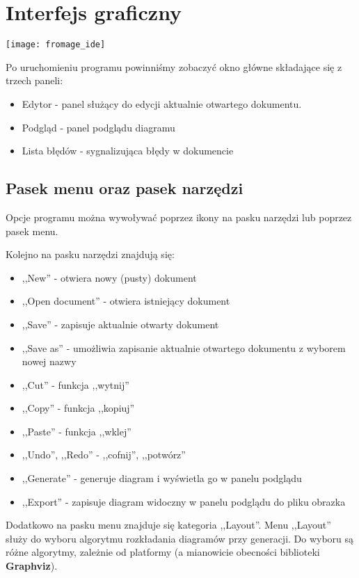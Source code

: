 \section{Interfejs graficzny}

\begin{center}
	\texttt{[image: fromage\_ide]}
\end{center}

Po uruchomieniu programu powinniśmy zobaczyć okno główne składające się z trzech paneli:

\begin{itemize}
	\item Edytor - panel służący do edycji aktualnie otwartego dokumentu.
	\item Podgląd - panel podglądu diagramu
	\item Lista błędów - sygnalizująca błędy w dokumencie
\end{itemize}

\subsection{Pasek menu oraz pasek narzędzi}
Opcje programu można wywoływać poprzez ikony na pasku narzędzi lub poprzez pasek menu.

Kolejno na pasku narzędzi znajdują się:
\begin{itemize}
	\item ,,New'' - otwiera nowy (pusty) dokument
	\item ,,Open document'' - otwiera istniejący dokument
	\item ,,Save'' - zapisuje aktualnie otwarty dokument
	\item ,,Save as'' - umożliwia zapisanie aktualnie otwartego dokumentu z wyborem nowej nazwy
	\item ,,Cut'' - funkcja ,,wytnij''
	\item ,,Copy'' - funkcja ,,kopiuj''
	\item ,,Paste'' - funkcja ,,wklej''
	\item ,,Undo'', ,,Redo'' - ,,cofnij'', ,,potwórz''
	\item ,,Generate'' - generuje diagram i wyświetla go w panelu podglądu
	\item ,,Export'' - zapisuje diagram widoczny w panelu podglądu do pliku obrazka
\end{itemize}

Dodatkowo na pasku menu znajduje się kategoria ,,Layout''. Menu ,,Layout'' służy do wyboru algorytmu rozkładania diagramów przy generacji. Do wyboru są różne algorytmy, zależnie od platformy (a mianowicie obecności biblioteki \textbf{Graphviz}).

